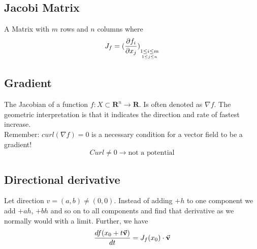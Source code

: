 \documentclass[8pt]{extarticle}
\newcommand{\R}{{\mathbb R}}
\newcommand{\X}{{\mathcal X}}
\newcommand{\ra}{{\rightarrow}}
\def\R{\mathbf{R}}
\def\X{X}
\begin{document}
\begin{multicols*}{3}
  \subsection{Jacobi Matrix}
  A Matrix with $m$ rows and $n$ columns where
  \begin{align*}
    J_f = (\pdv{f_i}{x_j}) \underset{\underset{1 \leq j \leq n}{1 \leq i \leq m}}{}
  \end{align*}
  \subsection{Gradient}
  The Jacobian of a function
  $f: \X \subset \R^n \ra \R$.
  Is often denoted as $\nabla f$. The geometric
  interpretation is that it indicates the
  direction and rate of fastest increase. \\
Remember: $curl(\nabla f) = 0$ is a necessary condition for a vector field to be a gradient!
$$Curl \neq 0 \rightarrow \text{not a potential}$$
  \subsection{Directional derivative}
  Let direction $v = (a, b) \neq (0, 0)$. Instead of
  adding $+h$ to one component we add $+ah$, $+bh$ and
  so on to all components and find that derivative as
  we normally would with a limit.
  Further, we have
  \begin{align*}
    \frac{df(x_0 + t \vectorarrow{v})}{dt} = J_f(x_0) \cdot \vectorarrow{v}
  \end{align*}


\end{multicols*}
\end{document}
